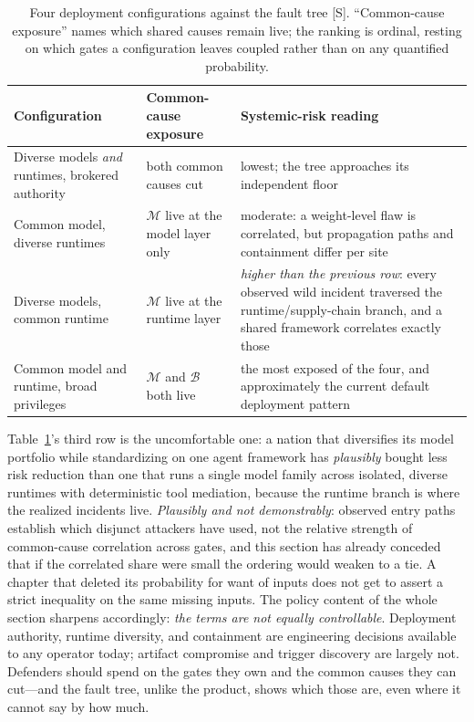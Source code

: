 \begin{table}[htbp]
  \centering
  \small
  \caption{Four deployment configurations against the fault tree [S]. ``Common-cause exposure'' names which shared causes remain live; the ranking is ordinal, resting on which gates a configuration leaves coupled rather than on any quantified probability.}
  \label{tab:configs}
  \begin{tabular}{p{44mm}p{40mm}p{52mm}}
    \toprule
    Configuration & Common-cause exposure & Systemic-risk reading \\
    \midrule
    Diverse models \emph{and} runtimes, brokered authority & both common causes cut & lowest; the tree approaches its independent floor \\
    \addlinespace
    Common model, diverse runtimes & $\mathcal{M}$ live at the model layer only & moderate: a weight-level flaw is correlated, but propagation paths and containment differ per site \\
    \addlinespace
    Diverse models, common runtime & $\mathcal{M}$ live at the runtime layer & \emph{higher than the previous row}: every observed wild incident traversed the runtime/supply-chain branch, and a shared framework correlates exactly those \\
    \addlinespace
    Common model and runtime, broad privileges & $\mathcal{M}$ and $\mathcal{B}$ both live & the most exposed of the four, and approximately the current default deployment pattern \\
    \bottomrule
  \end{tabular}
\end{table}

Table~\ref{tab:configs}'s third row is the uncomfortable one: a nation that diversifies its model portfolio while standardizing on one agent framework has \emph{plausibly} bought less risk reduction than one that runs a single model family across isolated, diverse runtimes with deterministic tool mediation, because the runtime branch is where the realized incidents live. \emph{Plausibly and not demonstrably}: observed entry paths establish which disjunct attackers have used, not the relative strength of common-cause correlation across gates, and this section has already conceded that if the correlated share were small the ordering would weaken to a tie. A chapter that deleted its probability for want of inputs does not get to assert a strict inequality on the same missing inputs. The policy content of the whole section sharpens accordingly: \emph{the terms are not equally controllable}. Deployment authority, runtime diversity, and containment are engineering decisions available to any operator today; artifact compromise and trigger discovery are largely not. Defenders should spend on the gates they own and the common causes they can cut---and the fault tree, unlike the product, shows which those are, even where it cannot say by how much.

